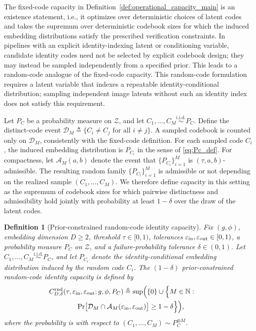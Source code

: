 \documentclass[journal]{IEEEtran}
\newtheorem{definition}[theorem]{Definition}
\begin{document}
\begin{bibunit}
The fixed-code capacity in Definition~\ref{def:operational_capacity_main} is an existence statement, i.e., it optimizes over deterministic choices of latent codes and takes the supremum over deterministic codebook sizes for which the induced embedding distributions satisfy the prescribed verification constraints. In pipelines with an explicit identity-indexing latent or conditioning variable, candidate identity codes need not be selected by explicit codebook design; they may instead be sampled independently from a specified prior. This leads to a random-code analogue of the fixed-code capacity. This random-code formulation requires a latent variable that indexes a repeatable identity-conditional distribution; sampling independent image latents without such an identity index does not satisfy this requirement.

 
Let $P_C$ be a probability measure on $\mathcal Z$, and let $C_1,\ldots,C_M \stackrel{\mathrm{i.i.d.}}{\sim} P_C$. Define the distinct-code event $\mathcal D_M\triangleq\{C_i\ne C_j\text{ for all }i\ne j\}$. A sampled codebook is counted only on $\mathcal D_M$, consistently with the fixed-code definition. For each sampled code $C_i$, the induced embedding distribution is $P_{C_i}$ in the sense of \eqref{eq:Pc_def}. For compactness, let $\mathcal A_M(a,b)$ denote the event that $\{P_{C_i}\}_{i=1}^M$ is $(\tau,a,b)$-admissible. The resulting random family $\{P_{C_i}\}_{i=1}^M$ is admissible or not depending on the realized sample $(C_1,\ldots,C_M)$. We therefore define capacity in this setting as the supremum of codebook sizes for which pairwise distinctness and admissibility hold jointly with probability at least $1-\delta$ over the draw of the latent codes.


\begin{definition}[Prior-constrained random-code identity capacity]
\label{def:random_capacity_main}
%
Fix $(g,\phi)$, embedding dimension $D\ge 2$, threshold $\tau\in[0,1)$, tolerances $\varepsilon_{\rm in},\varepsilon_{\rm out}\in[0,1)$, a probability measure $P_C$ on $\mathcal Z$, and a failure-probability tolerance $\delta\in(0,1)$. Let $C_1,\ldots,C_M \stackrel{\mathrm{i.i.d.}}{\sim} P_C$, and let $P_{C_i}$ denote the identity-conditional embedding distribution induced by the random code $C_i$. The $(1-\delta)$ prior-constrained random-code identity capacity is defined by
%
\begin{multline}
\!\!\!\!\!\!
C_{D,\delta}^{\mathrm{rnd}} (\tau,\varepsilon_{\rm in},\varepsilon_{\rm out};g,\phi,P_C)
\triangleq \sup\Bigl(\{0\}\cup\Bigl\{ M\in\mathbb N:\;\;\; \\ \;\;\;
\Pr\bigl[ \mathcal D_M\cap \mathcal A_M(\varepsilon_{\rm in},\varepsilon_{\rm out}) \bigr]
\ge 1-\delta \Bigr\}\Bigr),
\label{eq:random_capacity_def_main}
\end{multline}
%
where the probability is with respect to $(C_1,\ldots,C_M)\sim P_C^{\otimes M}$.
%
\end{definition}



\end{bibunit}
\end{document}
